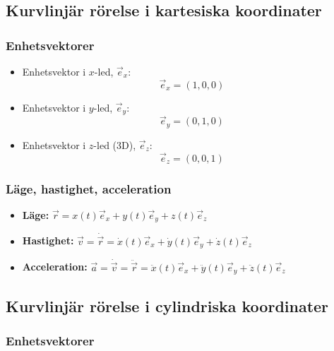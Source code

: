 \documentclass{article}
\newenvironment{ankiflashcard}[1]{}{}
\begin{document}
\begin{paracol}{2}
\subsection{Kurvlinjär rörelse i kartesiska koordinater}
\subsubsection{Enhetsvektorer}
\begin{itemize}
    \item Enhetsvektor i $x$-led, $\vec e_x$:
    $$\vec e_x = (1,0,0)$$
    \item Enhetsvektor i $y$-led, $\vec e_y$:
    $$\vec e_y = (0,1,0)$$
    \item Enhetsvektor i $z$-led (3D), $\vec e_z$:
    $$\vec e_z = (0,0,1)$$ 
\end{itemize}
\subsubsection{Läge, hastighet, acceleration}

\begin{ankiflashcard}{Definera läge, hastighet och acceleration i kartesiska koordinater.}
    
\begin{itemize}
    \item \textbf{Läge:} $\vec r = x(t)\vec e_x + y(t)\vec e_y + z(t)\vec e_z$
    \item \textbf{Hastighet:} $\vec v = \dot{\vec r} = \dot x(t)\vec e_x + \dot y(t)\vec e_y + \dot z(t)\vec e_z$
    \item \textbf{Acceleration:} $\vec a = \dot{\vec v} = \ddot{\vec r} = \ddot x(t)\vec e_x + \ddot y(t)\vec e_y + \ddot z(t)\vec e_z$
\end{itemize}
\end{ankiflashcard}

\subsection{Kurvlinjär rörelse i cylindriska koordinater}

\begin{ankiflashcard}{Definiera enhetsvektorerna i cylinderkoordinater.}
\subsubsection{Enhetsvektorer}


\end{ankiflashcard}
\end{paracol}
\end{document}
